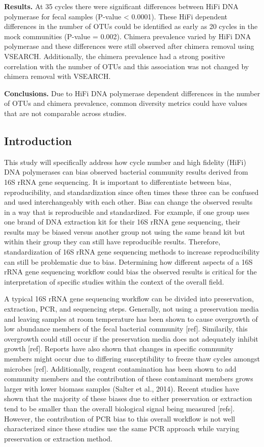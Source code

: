 \documentclass[12pt,]{article}
\begin{document}
\textbf{Results.} At 35 cycles there were significant differences
between HiFi DNA polymerase for fecal samples (P-value \textless{}
0.0001). These HiFi dependent differences in the number of OTUs could be
identified as early as 20 cycles in the mock communities (P-value =
0.002). Chimera prevalence varied by HiFi DNA polymerase and these
differences were still observed after chimera removal using VSEARCH.
Additionally, the chimera prevalence had a strong positive correlation
with the number of OTUs and this association was not changed by chimera
removal with VSEARCH.

\textbf{Conclusions.} Due to HiFi DNA polymerase dependent differences
in the number of OTUs and chimera prevalence, common diversity metrics
could have values that are not comparable across studies.

\newpage

\subsection{Introduction}\label{introduction}

This study will specifically address how cycle number and high fidelity
(HiFi) DNA polymerases can bias observed bacterial community results
derived from 16S rRNA gene sequencing. It is important to differentiate
between bias, reproducibility, and standardization since often times
these three can be confused and used interchangeably with each other.
Bias can change the observed results in a way that is reproducible and
standardized. For example, if one group uses one brand of DNA extraction
kit for their 16S rRNA gene sequencing, their results may be biased
versus another group not using the same brand kit but within their group
they can still have reproducible results. Therefore, standardization of
16S rRNA gene sequencing methods to increase reproducibility can still
be problematic due to bias. Determining how different aspects of a 16S
rRNA gene sequencing workflow could bias the observed results is
critical for the interpretation of specific studies within the context
of the overall field.

A typical 16S rRNA gene sequencing workflow can be divided into
preservation, extraction, PCR, and sequencing steps. Generally, not
using a preservation media and leaving samples at room temperature has
been shown to cause overgrowth of low abundance members of the fecal
bacterial community {[}ref{]}. Similarily, this overgrowth could still
occur if the preservation media does not adequately inhibit growth
{[}ref{]}. Reports have also shown that changes in specific community
members might occur due to differing susceptibility to freeze thaw
cycles amongst microbes {[}ref{]}. Additionally, reagent contamination
has been shown to add community members and the contribution of these
contaminant members grows larger with lower biomass samples (Salter et
al., 2014). Recent studies have shown that the majority of these biases
due to either preservation or extraction tend to be smaller than the
overall biological signal being measured {[}refs{]}. However, the
contribution of PCR bias to this overall workflow is not well
characterized since these studies use the same PCR approach while
varying preservation or extraction method.
\end{document}
